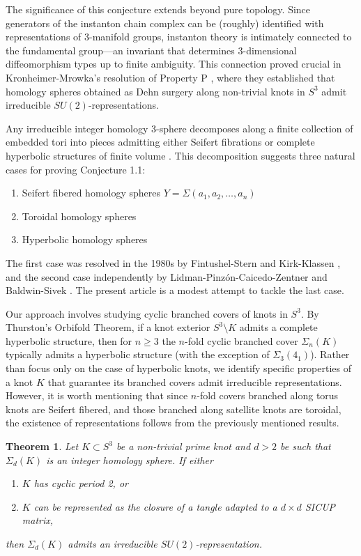 \documentclass[11pt]{amsart}
\newtheorem{theorem}{Theorem}[section]
\begin{document}
The significance of this conjecture extends beyond pure topology. Since generators of the instanton chain complex can be (roughly) identified with representations of 3-manifold groups, instanton theory is intimately connected to the fundamental group---an invariant that determines 3-dimensional diffeomorphism types up to finite ambiguity. This connection proved crucial in Kronheimer-Mrowka's resolution of Property P \cite{kronheimer-mrowka:P}, where they established that homology spheres obtained as Dehn surgery along non-trivial knots in $S^3$ admit irreducible $SU(2)$-representations.

Any irreducible integer homology 3-sphere decomposes along a finite collection of embedded tori into pieces admitting either Seifert fibrations or complete hyperbolic structures of finite volume \cite{en}. This decomposition suggests three natural cases for proving Conjecture 1.1:

\begin{enumerate}
\item Seifert fibered homology spheres $Y=\Sigma(a_1,a_2,\ldots,a_n)$
\item Toroidal homology spheres %
\item Hyperbolic homology spheres
\end{enumerate}

The first case was resolved in the 1980s by Fintushel-Stern \cite{fs} and Kirk-Klassen \cite{kirk-klassen}, and the second case independently by Lidman-Pinz\'on-Caicedo-Zentner \cite{toroidal} and Baldwin-Sivek \cite{bs-splicing}. The present article is a modest attempt to tackle the last case.

Our approach involves studying cyclic branched covers of knots in $S^3$. By Thurston's Orbifold Theorem, if a knot exterior $S^3\setminus K$ admits a complete hyperbolic structure, then for $n\geq 3$ the $n$-fold cyclic branched cover $\Sigma_n(K)$ typically admits a hyperbolic structure (with the exception of $\Sigma_3(4_1)$). Rather than focus only on the case of hyperbolic knots, we identify specific properties of a knot $K$ that guarantee its branched covers admit irreducible representations. However, it is worth mentioning that since $n$-fold covers branched along torus knots are Seifert fibered, and those branched along satellite knots are toroidal, the existence of representations follows from the previously mentioned results.

\begin{theorem}\label{mainthm} Let $K\subset S^3$ be a non-trivial prime knot and $d>2$ be such that $\Sigma_d(K)$ is an integer homology sphere. If either
\begin{enumerate}
\item\label{2per} $K$ has cyclic period 2, or
\item\label{nu} $K$ can be represented as the closure of a tangle adapted to a $d\times d$ SICUP matrix,
\end{enumerate}
then $\Sigma_d(K)$ admits an irreducible $SU(2)$-representation.
\end{theorem}
\end{document}
